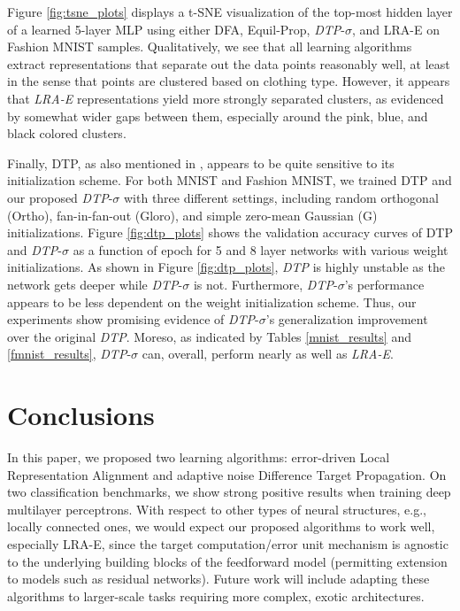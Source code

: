 \documentclass[letterpaper]{article} %
\begin{document}
Figure \ref{fig:tsne_plots} displays a t-SNE \cite{maaten2008visualizing} visualization of the top-most hidden layer of a learned 5-layer MLP using either DFA, Equil-Prop, \emph{DTP}-$\sigma$, and LRA-E on Fashion MNIST samples. Qualitatively, we see that all learning algorithms extract representations that separate out the data points reasonably well, at least in the sense that points are clustered based on clothing type. However, it appears that \emph{LRA-E} representations yield more strongly separated clusters, as evidenced by somewhat wider gaps between them, especially around the pink, blue, and black colored clusters.

Finally, DTP, as also mentioned in \cite{ororbia2018conducting}, appears to be quite sensitive to its initialization scheme. For both MNIST and Fashion MNIST, we trained DTP and our proposed \emph{DTP}-$\sigma$ with three different settings, including random orthogonal (Ortho), fan-in-fan-out (Gloro), and simple zero-mean Gaussian (G) initializations. Figure \ref{fig:dtp_plots} shows the validation accuracy curves of DTP and \textit{DTP}-$\sigma$ as a function of epoch for 5 and 8 layer networks
with various weight initializations. As shown in Figure \ref{fig:dtp_plots}, \emph{DTP} is highly unstable as the network gets deeper while \emph{DTP}-$\sigma$ is not. Furthermore, \emph{DTP}-$\sigma$'s performance appears to be less dependent on the weight initialization scheme.
Thus, our experiments show promising evidence of \emph{DTP}-$\sigma$'s generalization improvement over the original \emph{DTP}. Moreso, as indicated by Tables \ref{mnist_results} and \ref{fmnist_results}, \emph{DTP}-$\sigma$ can, overall, perform nearly as well as \emph{LRA-E}.


\section{Conclusions}
\label{conc}
In this paper, we proposed two learning algorithms: error-driven Local Representation Alignment and adaptive noise Difference Target Propagation. On two classification benchmarks, we show strong positive results when training deep multilayer perceptrons.
With respect to other types of neural structures, e.g., locally connected ones, we would expect our proposed algorithms to work well, especially LRA-E, since the target computation/error unit mechanism is agnostic to the underlying building blocks of the feedforward model (permitting extension to models such as residual networks).
Future work will include adapting these algorithms to larger-scale tasks requiring more complex, exotic architectures.
\end{document}
